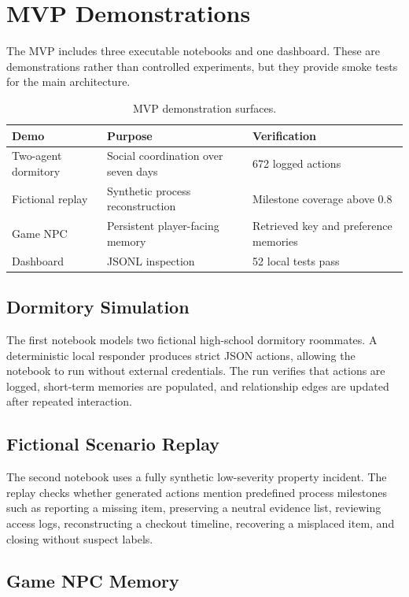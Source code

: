 \section{MVP Demonstrations}

The MVP includes three executable notebooks and one dashboard. These are demonstrations rather than controlled experiments, but they provide smoke tests for the main architecture.

\begin{table}[h]
\centering
\begin{tabular}{lll}
\toprule
Demo & Purpose & Verification \\
\midrule
Two-agent dormitory & Social coordination over seven days & 672 logged actions \\
Fictional replay & Synthetic process reconstruction & Milestone coverage above 0.8 \\
Game NPC & Persistent player-facing memory & Retrieved key and preference memories \\
Dashboard & JSONL inspection & 52 local tests pass \\
\bottomrule
\end{tabular}
\caption{MVP demonstration surfaces.}
\end{table}

\subsection{Dormitory Simulation}

The first notebook models two fictional high-school dormitory roommates. A deterministic local responder produces strict JSON actions, allowing the notebook to run without external credentials. The run verifies that actions are logged, short-term memories are populated, and relationship edges are updated after repeated interaction.

\subsection{Fictional Scenario Replay}

The second notebook uses a fully synthetic low-severity property incident. The replay checks whether generated actions mention predefined process milestones such as reporting a missing item, preserving a neutral evidence list, reviewing access logs, reconstructing a checkout timeline, recovering a misplaced item, and closing without suspect labels.

\subsection{Game NPC Memory}


